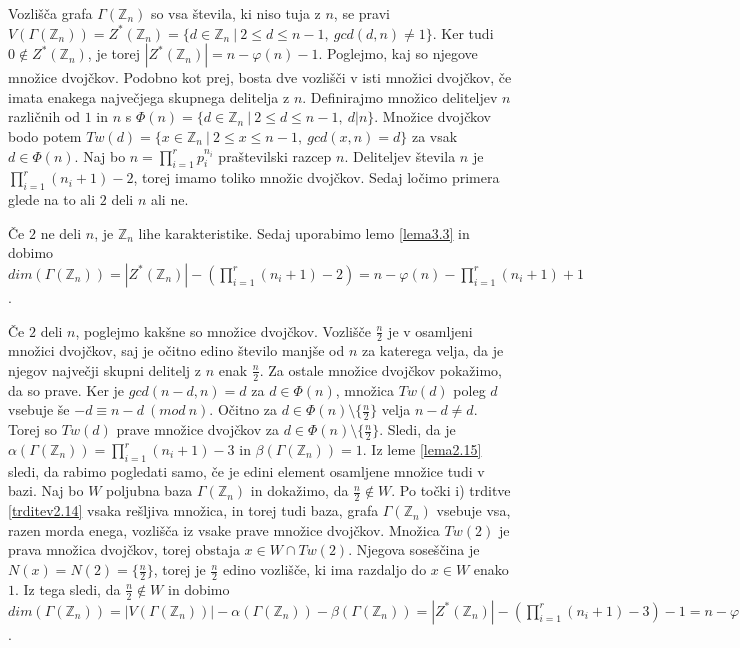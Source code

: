 \documentclass[mat1, tisk]{fmfdelo}
\newcommand{\Z}{\mathbb Z}
\begin{document}
\begin{dokaz}
  Vozlišča grafa $\Gamma(\Z_{n})$ so vsa števila, ki niso tuja z $n$, se pravi
  $V(\Gamma(\Z_{n})) = Z^*(\Z_{n}) = \{d \in \Z_{n}~|~2 \leq d \leq n - 1,~gcd(d,n) \neq 1\}$. 
  Ker tudi $0 \notin Z^*(\Z_{n})$, je torej $|Z^*(\Z_{n})| = n - \varphi(n) - 1$. Poglejmo, kaj 
  so njegove množice dvojčkov. Podobno kot prej, bosta dve vozlišči v isti množici dvojčkov, 
  če imata enakega največjega skupnega delitelja z $n$. Definirajmo množico deliteljev $n$ 
  različnih od $1$ in $n$ s $\Phi(n) =\{d \in \Z_{n}~|~2 \leq d \leq n - 1,~d|n\}$. Množice dvojčkov 
  bodo potem $Tw(d) = \{x \in \Z_{n}~|~2 \leq x \leq n - 1,~gcd(x,n) = d\}$ za vsak $d \in \Phi(n)$. 
  Naj bo $n = \prod\limits_{i = 1}^{r}p_i^{n_i}$ praštevilski razcep $n$. Deliteljev števila 
  $n$ je $\prod\limits_{i = 1}^{r}(n_i + 1) - 2$, torej imamo toliko množic dvojčkov. Sedaj ločimo primera 
  glede na to ali $2$ deli $n$ ali ne.

  Če $2$ ne deli $n$, je $\Z_{n}$ lihe karakteristike. Sedaj uporabimo lemo \ref{lema3.3} in dobimo 
  $dim(\Gamma(\Z_{n})) = |Z^*(\Z_{n})| - (\prod\limits_{i = 1}^{r}(n_i + 1) - 2) = n - \varphi(n) - \prod\limits_{i = 1}^{r}(n_i + 1) + 1$.

  Če $2$ deli $n$, poglejmo kakšne so množice dvojčkov. Vozlišče $\frac{n}{2}$ je v osamljeni množici 
  dvojčkov, saj je očitno edino število manjše od $n$ za katerega velja, da je njegov največji 
  skupni delitelj z $n$ enak $\frac{n}{2}$. Za ostale množice dvojčkov pokažimo, da so prave. Ker je 
  $gcd(n-d, n) = d$ za $d \in \Phi(n)$, množica $Tw(d)$ poleg $d$ vsebuje še $-d \equiv n - d ~(mod~n)$. 
  Očitno za $d \in \Phi(n) \setminus \{\frac{n}{2}\}$ velja $ n - d \neq d$. Torej  
  so $Tw(d)$ prave množice dvojčkov za $d \in \Phi(n) \setminus \{\frac{n}{2}\}$. Sledi, da je 
  $\alpha(\Gamma(\Z_{n})) = \prod\limits_{i = 1}^{r}(n_i + 1) - 3$ in $\beta(\Gamma(\Z_{n})) = 1$. 
  Iz leme \ref{lema2.15} sledi, da rabimo pogledati samo, če je edini element 
  osamljene množice tudi v bazi. Naj bo $W$ poljubna 
  baza $\Gamma(\Z_{n})$ in dokažimo, da $\frac{n}{2} \notin W$. Po točki i) 
  trditve \ref{trditev2.14} vsaka rešljiva množica, in torej tudi baza, grafa $\Gamma(\Z_{n})$ 
  vsebuje vsa, razen morda enega, vozlišča iz vsake prave množice dvojčkov. Množica $Tw(2)$ je 
  prava množica dvojčkov, torej obstaja $x \in W \cap Tw(2)$. Njegova soseščina je 
  $N(x) = N(2) = \{\frac{n}{2}\}$, torej je $\frac{n}{2}$ edino vozlišče, ki ima razdaljo 
  do $x \in W$ enako $1$. Iz tega sledi, da $\frac{n}{2} \notin W$ in dobimo 
  $dim(\Gamma(\Z_{n})) = |V(\Gamma(\Z_{n}))| - \alpha(\Gamma(\Z_{n})) - \beta(\Gamma(\Z_{n})) = |Z^*(\Z_{n})| - (\prod\limits_{i = 1}^{r}(n_i + 1) - 3) - 1= n - \varphi(n) - \prod\limits_{i = 1}^{r}(n_i + 1) + 1$.
\end{dokaz}
%
%
%
\end{document}
